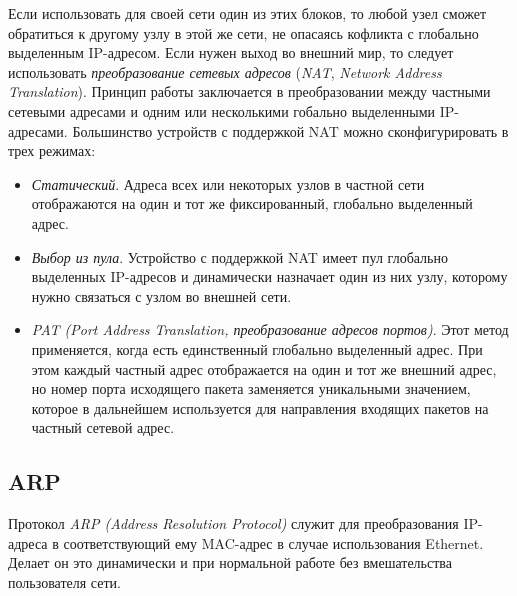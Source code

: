 Если использовать для своей сети один из этих блоков, то любой узел сможет обратиться к другому узлу в этой же сети, не опасаясь кофликта с глобально выделенным IP-адресом. Если нужен выход во внешний мир, то следует использовать \emph{преобразование сетевых адресов} (\emph{NAT}, \emph{Network Address Translation}). Принцип работы заключается в преобразовании между частными сетевыми адресами и одним или несколькими гобально выделенными IP-адресами. Большинство устройств с поддержкой NAT можно сконфигурировать в трех режимах:
\begin{itemize}
  \item \emph{Статический}. Адреса всех или некоторых узлов в частной сети отображаются на один и тот же фиксированный, глобально выделенный адрес.
  \item \emph{Выбор из пула}. Устройство с поддержкой NAT имеет пул глобально выделенных IP-адресов и динамически назначает один из них узлу, которому нужно связаться с узлом во внешней сети.
  \item \emph{PAT (Port Address Translation, преобразование адресов портов)}. Этот метод применяется, когда есть единственный глобально выделенный адрес. При этом каждый частный адрес отображается на один и тот же внешний адрес, но номер порта исходящего пакета заменяется уникальными значением, которое в дальнейшем используется для направления входящих пакетов на частный сетевой адрес.
\end{itemize}

\subsection{ARP}
Протокол \emph{ARP (Address Resolution Protocol)} служит для преобразования IP-адреса в соответствующий ему MAC-адрес в случае использования Ethernet. Делает он это динамически и при нормальной работе без вмешательства пользователя сети.

